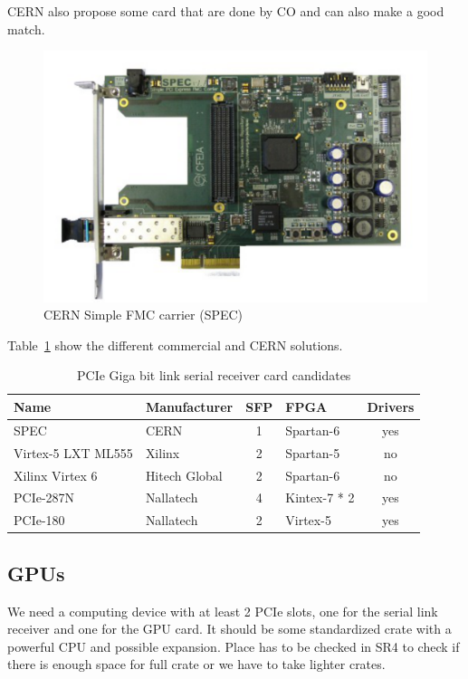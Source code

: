	\gls{CERN} also propose some card that are done by \gls{CO} and can also make a good match.

	\begin{figure}[H]
	\caption{CERN Simple FMC carrier (SPEC)}
	\label{fig:spec}
	\centering
	\includegraphics[scale=0.3]{spec_top.pdf}
	\end{figure}

	Table~\ref{tab:receiver_cards} show the different commercial and CERN solutions.

	\begin{table}[H]
		\caption{PCIe Giga bit link serial receiver card candidates}
		\label{tab:receiver_cards}
		\centering
		\begin{tabular}{|ll|c|l|c|}
			\hline
				Name & Manufacturer & SFP & FPGA & Drivers \\
			\hline
			\hline
				SPEC & CERN & 1 & Spartan-6 & yes \\
			\hline
				Virtex-5 LXT ML555 & Xilinx & 2 & Spartan-5 & no \\
			\hline
				Xilinx Virtex 6 & Hitech Global & 2 & Spartan-6 & no \\
			\hline		
				PCIe-287N & Nallatech & 4 & Kintex-7 * 2 & yes \\		
				PCIe-180 & Nallatech & 2 & Virtex-5 & yes \\
			\hline
		\end{tabular}
	\end{table}

	\subsection{GPUs}

	We need a computing device with at least 2 PCIe slots, one for the serial link receiver and one for the \gls{GPU} card. It should be some standardized crate with a powerful \gls{CPU} and possible expansion. Place has to be checked in SR4 to check if there is enough space for full crate or we have to take lighter crates.

